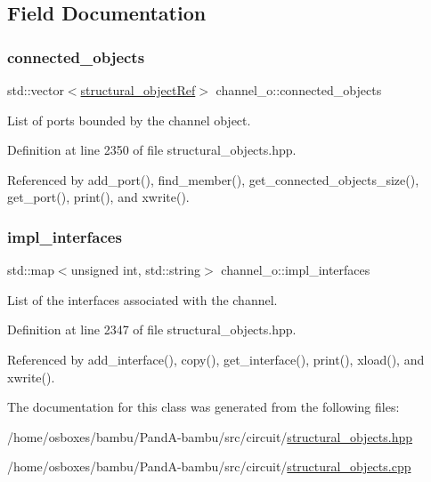 \subsection{Field Documentation}
\mbox{\label{classchannel__o_ab64ac6fc98c5f62393c28bac97fa31a4}} 
\subsubsection{\texorpdfstring{connected\+\_\+objects}{connected\_objects}}
{\footnotesize\ttfamily std\+::vector$<$\hyperlink{structural__objects_8hpp_a8ea5f8cc50ab8f4c31e2751074ff60b2}{structural\+\_\+object\+Ref}$>$ channel\+\_\+o\+::connected\+\_\+objects\hspace{0.3cm}{\ttfamily [private]}}



List of ports bounded by the channel object. 



Definition at line 2350 of file structural\+\_\+objects.\+hpp.



Referenced by add\+\_\+port(), find\+\_\+member(), get\+\_\+connected\+\_\+objects\+\_\+size(), get\+\_\+port(), print(), and xwrite().

\mbox{\label{classchannel__o_a20d11d1f89c57c8da3b8225016c06450}} 
\subsubsection{\texorpdfstring{impl\+\_\+interfaces}{impl\_interfaces}}
{\footnotesize\ttfamily std\+::map$<$unsigned int, std\+::string$>$ channel\+\_\+o\+::impl\+\_\+interfaces\hspace{0.3cm}{\ttfamily [private]}}



List of the interfaces associated with the channel. 



Definition at line 2347 of file structural\+\_\+objects.\+hpp.



Referenced by add\+\_\+interface(), copy(), get\+\_\+interface(), print(), xload(), and xwrite().



The documentation for this class was generated from the following files\+:\begin{DoxyCompactItemize}
\item 
/home/osboxes/bambu/\+Pand\+A-\/bambu/src/circuit/\hyperlink{structural__objects_8hpp}{structural\+\_\+objects.\+hpp}\item 
/home/osboxes/bambu/\+Pand\+A-\/bambu/src/circuit/\hyperlink{structural__objects_8cpp}{structural\+\_\+objects.\+cpp}\end{DoxyCompactItemize}
